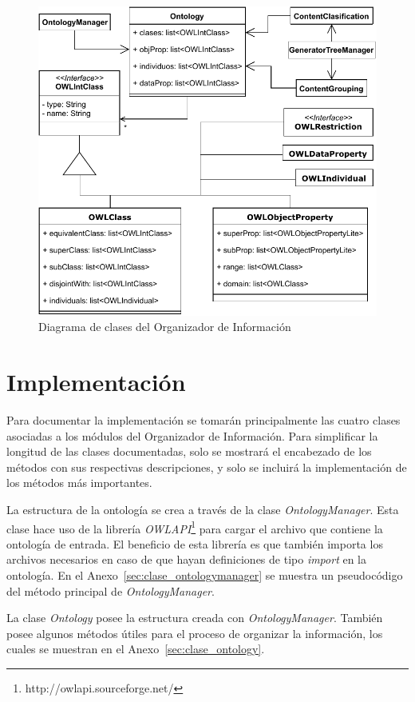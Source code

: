 \begin{figure}
    \centering
    \includegraphics{img/organizacion_informacion/diagrama_clases_organizador_informacion.pdf}
    \caption{Diagrama de clases del Organizador de Información}
    \label{fig:diagrama_clases_organizador}
\end{figure}

\section{Implementación}
Para documentar la implementación se tomarán principalmente las cuatro clases asociadas a los módulos del Organizador de Información. Para simplificar la longitud de las clases documentadas, solo se mostrará el encabezado de los métodos con sus respectivas descripciones, y solo se incluirá la implementación de los métodos más importantes.

La estructura de la ontología se crea a través de la clase \emph{OntologyManager}. Esta clase hace uso de la librería  \emph{OWLAPI}\footnote{http://owlapi.sourceforge.net/} para cargar el archivo que contiene la ontología de entrada. El beneficio de esta librería es que también importa los archivos necesarios en caso de que hayan definiciones de tipo \emph{import} en la ontología. En el Anexo~\ref{sec:clase_ontologymanager} se muestra un pseudocódigo del método principal de \emph{OntologyManager}.

La clase \emph{Ontology} posee la estructura creada con \emph{OntologyManager}. También posee algunos métodos útiles para el proceso de organizar la información, los cuales se muestran en el Anexo~\ref{sec:clase_ontology}.

